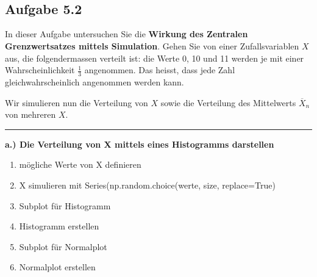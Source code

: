 \documentclass[11pt]{article}
\providecommand{\tightlist}{%
      \setlength{\itemsep}{0pt}\setlength{\parskip}{0pt}}
\begin{document}
    \begin{center}
    \end{center}
    { \hspace*{\fill} \\}
    
    \begin{center}
    \end{center}
    { \hspace*{\fill} \\}
    
    \subsection{Aufgabe 5.2}\label{aufgabe-5.2}

    In dieser Aufgabe untersuchen Sie die \textbf{Wirkung des Zentralen
Grenzwertsatzes mittels Simulation}. Gehen Sie von einer
Zufallsvariablen \(X\) aus, die folgendermassen verteilt ist: die Werte
0, 10 und 11 werden je mit einer Wahrscheinlichkeit \(\frac{1}{3}\)
angenommen. Das heisst, dass jede Zahl gleichwahrscheinlich angenommen
werden kann.

    Wir simulieren nun die Verteilung von \(X\) sowie die Verteilung des
Mittelwerts \(\overline{X}_n\) von mehreren \(X\).

\begin{center}\rule{0.5\linewidth}{\linethickness}\end{center}

\textbf{a.) Die Verteilung von X mittels eines Histogramms darstellen}

\begin{enumerate}
\def\labelenumi{\arabic{enumi}.}
\tightlist
\item
  mögliche Werte von X definieren
\item
  X simulieren mit Series(np.random.choice(werte, size, replace=True)
\item
  Subplot für Histogramm
\item
  Histogramm erstellen
\item
  Subplot für Normalplot
\item
  Normalplot erstellen
\end{enumerate}
\end{document}
